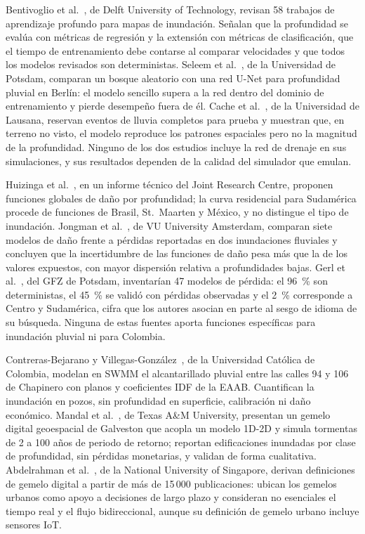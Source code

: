 \documentclass[journal]{IEEEtran}
\begin{document}
Bentivoglio et al.~\cite{bentivoglio2022}, de Delft University of Technology, revisan 58 trabajos de aprendizaje profundo para mapas de inundación. Señalan que la profundidad se evalúa con métricas de regresión y la extensión con métricas de clasificación, que el tiempo de entrenamiento debe contarse al comparar velocidades y que todos los modelos revisados son deterministas. Seleem et al.~\cite{seleem2023}, de la Universidad de Potsdam, comparan un bosque aleatorio con una red U-Net para profundidad pluvial en Berlín: el modelo sencillo supera a la red dentro del dominio de entrenamiento y pierde desempeño fuera de él. Cache et al.~\cite{cache2024}, de la Universidad de Lausana, reservan eventos de lluvia completos para prueba y muestran que, en terreno no visto, el modelo reproduce los patrones espaciales pero no la magnitud de la profundidad. Ninguno de los dos estudios incluye la red de drenaje en sus simulaciones, y sus resultados dependen de la calidad del simulador que emulan.

Huizinga et al.~\cite{huizinga2017}, en un informe técnico del Joint Research Centre, proponen funciones globales de daño por profundidad; la curva residencial para Sudamérica procede de funciones de Brasil, St.~Maarten y México, y no distingue el tipo de inundación. Jongman et al.~\cite{jongman2012}, de VU University Amsterdam, comparan siete modelos de daño frente a pérdidas reportadas en dos inundaciones fluviales y concluyen que la incertidumbre de las funciones de daño pesa más que la de los valores expuestos, con mayor dispersión relativa a profundidades bajas. Gerl et al.~\cite{gerl2016}, del GFZ de Potsdam, inventarían 47 modelos de pérdida: el 96~\% son deterministas, el 45~\% se validó con pérdidas observadas y el 2~\% corresponde a Centro y Sudamérica, cifra que los autores asocian en parte al sesgo de idioma de su búsqueda. Ninguna de estas fuentes aporta funciones específicas para inundación pluvial ni para Colombia.

Contreras-Bejarano y Villegas-González~\cite{contreras2019}, de la Universidad Católica de Colombia, modelan en SWMM el alcantarillado pluvial entre las calles 94 y 106 de Chapinero con planos y coeficientes IDF de la EAAB. Cuantifican la inundación en pozos, sin profundidad en superficie, calibración ni daño económico. Mandal et al.~\cite{mandal2026}, de Texas A\&M University, presentan un gemelo digital geoespacial de Galveston que acopla un modelo 1D-2D y simula tormentas de 2 a 100 años de periodo de retorno; reportan edificaciones inundadas por clase de profundidad, sin pérdidas monetarias, y validan de forma cualitativa. Abdelrahman et al.~\cite{abdelrahman2025}, de la National University of Singapore, derivan definiciones de gemelo digital a partir de más de 15\,000 publicaciones: ubican los gemelos urbanos como apoyo a decisiones de largo plazo y consideran no esenciales el tiempo real y el flujo bidireccional, aunque su definición de gemelo urbano incluye sensores IoT.
\end{document}
